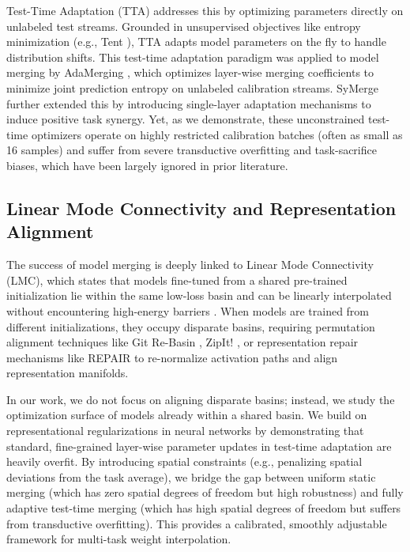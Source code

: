 Test-Time Adaptation (TTA) addresses this by optimizing parameters directly on unlabeled test streams. Grounded in unsupervised objectives like entropy minimization (e.g., Tent \cite{wang2021tent}), TTA adapts model parameters on the fly to handle distribution shifts. This test-time adaptation paradigm was applied to model merging by AdaMerging \cite{yang2024adamerging}, which optimizes layer-wise merging coefficients to minimize joint prediction entropy on unlabeled calibration streams. SyMerge \cite{jung2025symerge} further extended this by introducing single-layer adaptation mechanisms to induce positive task synergy. Yet, as we demonstrate, these unconstrained test-time optimizers operate on highly restricted calibration batches (often as small as 16 samples) and suffer from severe transductive overfitting and task-sacrifice biases, which have been largely ignored in prior literature.

\subsection{Linear Mode Connectivity and Representation Alignment}
The success of model merging is deeply linked to Linear Mode Connectivity (LMC), which states that models fine-tuned from a shared pre-trained initialization lie within the same low-loss basin and can be linearly interpolated without encountering high-energy barriers \cite{frankle2020linear, mirzadeh2020linear}. When models are trained from different initializations, they occupy disparate basins, requiring permutation alignment techniques like Git Re-Basin \cite{ainsworth2022git}, ZipIt! \cite{zhang2023zipit}, or representation repair mechanisms like REPAIR \cite{jordan2022repair} to re-normalize activation paths and align representation manifolds.

In our work, we do not focus on aligning disparate basins; instead, we study the optimization surface of models already within a shared basin. We build on representational regularizations in neural networks by demonstrating that standard, fine-grained layer-wise parameter updates in test-time adaptation are heavily overfit. By introducing spatial constraints (e.g., penalizing spatial deviations from the task average), we bridge the gap between uniform static merging (which has zero spatial degrees of freedom but high robustness) and fully adaptive test-time merging (which has high spatial degrees of freedom but suffers from transductive overfitting). This provides a calibrated, smoothly adjustable framework for multi-task weight interpolation.